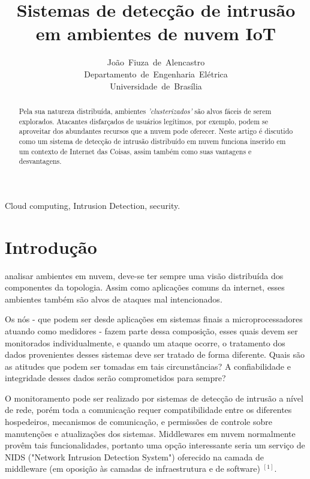 \documentclass[journal]{IEEEtran}
\begin{document}
\title{Sistemas de detecção de intrusão\\ em ambientes de nuvem IoT}


\author{João~Fiuza~de~Alencastro\\Departamento~de~Engenharia~Elétrica\\Universidade~de~Brasília}%




\maketitle


\begin{abstract}
Pela sua natureza distribuída, ambientes \textit{'clusterizados'} são alvos fáceis de serem explorados. Atacantes disfarçados de usuários legítimos, por exemplo, podem se aproveitar dos abundantes recursos que a nuvem pode oferecer. Neste artigo é discutido como um sistema de detecção de intrusão distribuído em nuvem funciona inserido em um contexto de Internet das Coisas, assim também como suas vantagens e desvantagens.%
\end{abstract}

\begin{IEEEkeywords}
Cloud computing, Intrusion Detection, security.
\end{IEEEkeywords}


\IEEEpeerreviewmaketitle



\section{Introdução}
 analisar ambientes em nuvem, deve-se ter sempre uma visão distribuída dos componentes da topologia. Assim como aplicações comuns da internet, esses ambientes também são alvos de ataques mal intencionados. \par
Os nós - que podem ser desde aplicações em sistemas finais a microprocessadores atuando como medidores - fazem parte dessa composição, esses quais devem ser monitorados individualmente, e quando um ataque ocorre, o tratamento dos dados provenientes desses sistemas deve ser tratado de forma diferente. Quais são as atitudes que podem ser tomadas em tais circunstâncias? A confiabilidade e integridade desses dados serão comprometidos para sempre? \par
O monitoramento pode ser realizado por sistemas de detecção de intrusão a nível de rede, porém toda a comunicação requer compatibilidade entre os diferentes hospedeiros, mecanismos de comunicação, e permissões de controle sobre manutenções e atualizações dos sistemas. Middlewares em nuvem normalmente provêm tais funcionalidades, portanto uma opção interessante seria um serviço de NIDS ("Network Intrusion Detection System") oferecido na camada de middleware (em oposição às camadas de infraestrutura e de software) $^{ [1] }$.
\end{document}
